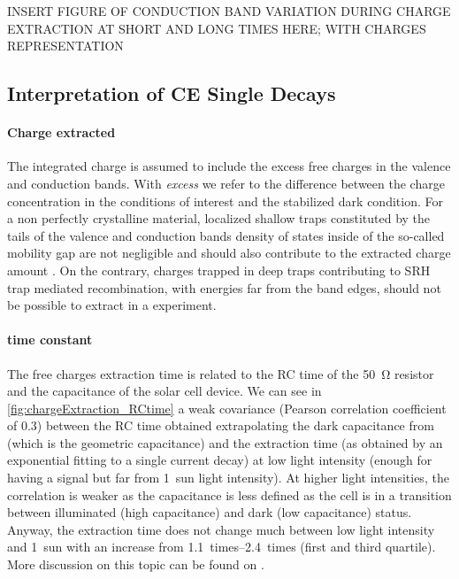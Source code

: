 	INSERT FIGURE OF CONDUCTION BAND VARIATION DURING CHARGE EXTRACTION AT SHORT AND LONG TIMES HERE; WITH CHARGES REPRESENTATION



	\subsection{Interpretation of CE Single Decays}

		\paragraph{Charge extracted}
		The integrated charge is assumed to include the excess free charges in the valence and conduction bands.
		With \emph{excess} we refer to the difference between the charge concentration in the conditions of interest and the stabilized dark condition.
		For a non perfectly crystalline material, localized shallow traps constituted by the tails of the valence and conduction bands density of states inside of the so\hyp{}called mobility gap \cite{Pieters2009} are not negligible and should also contribute to the extracted charge amount \cite{Kirchartz2012,Du2018}.
		On the contrary, charges trapped in deep traps contributing to SRH trap mediated recombination, with energies far from the band edges, should not be possible to extract in a  experiment.

		\paragraph{ time constant}\label{ce_time}
		The free charges extraction time is related to the RC time of the \SI{50}{\ohm} resistor and the capacitance of the solar cell device.
		We can see in \cref{fig:chargeExtraction_RCtime} a weak covariance (Pearson correlation coefficient of 0.3) between the RC time obtained extrapolating the dark capacitance from  (which is the geometric capacitance) and the extraction time (as obtained by an exponential fitting to a single  current decay) at low light intensity (enough for having a signal but far from 1~sun light intensity).
		At higher light intensities, the correlation is weaker as the capacitance is less defined as the cell is in a transition between illuminated (high capacitance) and dark (low capacitance) status.
		Anyway, the extraction time does not change much between low light intensity and 1~sun with an increase from \SIrange{1.1}{2.4}{times} (first and third quartile).
		More discussion on this topic can be found on .

